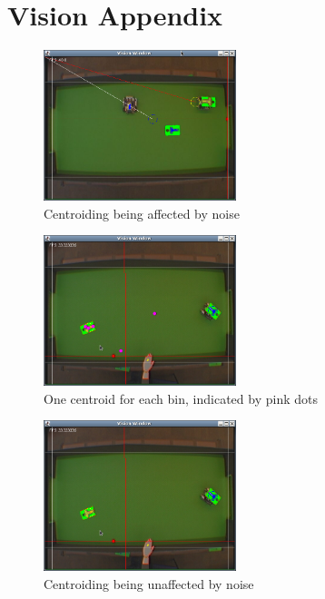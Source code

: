 \section{Vision Appendix}
\label{apx:vision}

\begin{figure}[h!]
  \label{vis1}
  \caption{Centroiding being affected by noise}
  \centering
    \includegraphics[width=0.5\textwidth]{randy_bins_before.png}
\end{figure}

\begin{figure}[h!]
  \label{vis2}
  \caption{One centroid for each bin, indicated by pink dots}
  \centering
    \includegraphics[width=0.5\textwidth]{randy_bins_after_mult.png}
\end{figure}

\begin{figure}[h!]
  \label{vis3}
  \caption{Centroiding being unaffected by noise}
  \centering
    \includegraphics[width=0.5\textwidth]{randy_bins_after.png}
\end{figure}

